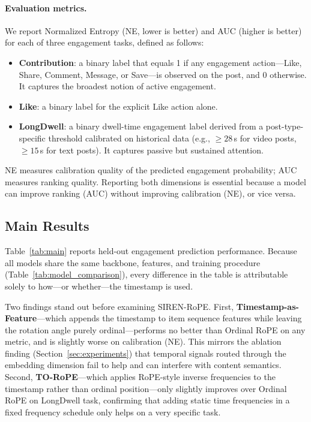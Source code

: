 \documentclass{article}
\begin{document}
\paragraph{Evaluation metrics.}
We report Normalized Entropy (NE, lower is better) and AUC (higher is
better) for each of three engagement tasks, defined as follows:
\begin{itemize}
  \item \textbf{Contribution}: a binary label that equals 1 if any engagement
    action---Like, Share, Comment, Message, or Save---is observed on the post,
    and 0 otherwise. It captures the broadest notion of active engagement.
  \item \textbf{Like}: a binary label for the explicit Like action alone.
  \item \textbf{LongDwell}: a binary dwell-time engagement label derived from a
    post-type-specific threshold calibrated on historical data (e.g.,
    $\geq\!28$\,s for video posts, $\geq\!15$\,s for text posts). It captures
    passive but sustained attention.
\end{itemize}
NE measures calibration quality of the predicted engagement probability;
AUC measures ranking quality. Reporting both dimensions is essential because
a model can improve ranking (AUC) without improving calibration (NE), or
vice versa.

\subsection{Main Results}

Table~\ref{tab:main} reports held-out engagement prediction performance.
Because all models share the same backbone, features, and training procedure
(Table~\ref{tab:model_comparison}), every difference in the table is
attributable solely to how---or whether---the timestamp is used.

Two findings stand out before examining SIREN-RoPE.  First,
\textbf{Timestamp-as-Feature}---which appends the timestamp to item sequence
features while leaving the rotation angle purely ordinal---performs no better
than Ordinal RoPE on any metric, and is slightly worse on calibration (NE).
This mirrors the ablation finding (Section~\ref{sec:experiments}) that temporal signals routed through the embedding dimension fail to help and can interfere with content semantics.  Second,
\textbf{TO-RoPE}---which applies RoPE-style inverse frequencies to the
timestamp rather than ordinal position---only slightly improves over
Ordinal RoPE on LongDwell task, confirming that adding static time frequencies in a fixed
frequency schedule only helps on a very specific task.
\end{document}
